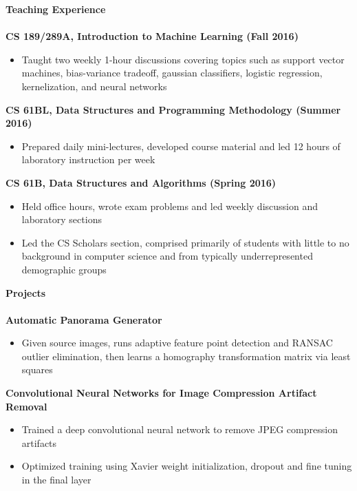 \documentclass{article}
\begin{document}
\noindent
\textbf{{\Large Teaching Experience}}\\[-2mm]
\HRule\\
\textbf{CS 189/289A, Introduction to Machine Learning (Fall 2016)}
\begin{itemize}
\vspace{-1.8mm}
\item Taught two weekly 1-hour discussions covering topics such as support vector machines, bias-variance tradeoff, gaussian classifiers, logistic regression, kernelization, and neural networks
\end{itemize}
\textbf{CS 61BL, Data Structures and Programming Methodology (Summer 2016)}
\begin{itemize}
\vspace{-1.8mm}
\item Prepared daily mini-lectures, developed course material and led 12 hours of laboratory instruction per week
\end{itemize}
\textbf{CS 61B, Data Structures and Algorithms (Spring 2016)}
\begin{itemize}
\vspace{-1.8mm}
\item Held office hours, wrote exam problems and led weekly discussion and laboratory sections
\vspace{-2.5mm}
\item Led the CS Scholars section, comprised primarily of students with little to no background in computer science and from typically underrepresented demographic groups
\end{itemize}

\noindent
\textbf{\Large Projects}\\[-2mm]
\HRule\\
\textbf{Automatic Panorama Generator} 
\begin{itemize}
\vspace{-1.8mm}
\item Given source images, runs adaptive feature point detection and RANSAC outlier elimination, then learns a homography transformation matrix via least squares
\end{itemize}
\vspace{-1.8mm}
\noindent
\textbf{Convolutional Neural Networks for Image Compression Artifact Removal}
\begin{itemize}
\vspace{-1.8mm}
\item Trained a deep convolutional neural network to remove JPEG compression artifacts
\vspace{-2.5mm}
\item Optimized training using Xavier weight initialization, dropout and fine tuning in the final layer
\end{itemize}
\end{document}
